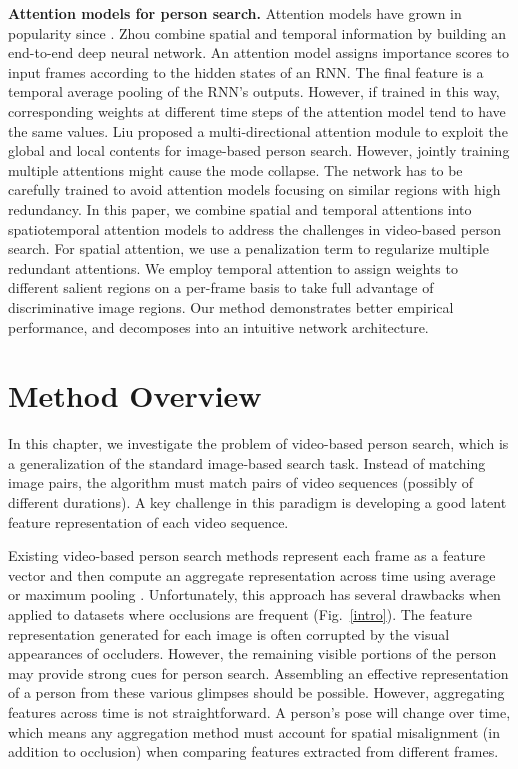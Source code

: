 \textbf{Attention models for person search.} Attention models \cite{xu2015show, Li_2017_CVPR, Li_2017_ICCV} have grown in popularity since \cite{xu2015show}. Zhou \etal \cite{zhousee} combine spatial and temporal information by building an end-to-end deep neural network. An attention model assigns importance scores to input frames according to the hidden states of an RNN. The final feature is a temporal average pooling of the RNN's outputs.
However, if trained in this way, corresponding weights at different time steps of the attention model tend to have the same values. 
Liu \etal \cite{liu2017hydraplus} proposed a multi-directional attention module to exploit the global and local contents for image-based person search. However, jointly training multiple attentions might cause the mode collapse. The network has to be carefully trained to avoid attention models focusing on similar regions with high redundancy. 
In this paper, we combine spatial and temporal attentions into spatiotemporal attention models to address the challenges in video-based person search. 
For spatial attention, we use a penalization term to regularize multiple redundant attentions. 
We employ temporal attention to assign weights to different salient regions on a per-frame basis to take full advantage of discriminative image regions. Our method demonstrates better empirical performance, and decomposes into an intuitive network architecture.


\section{Method Overview} %
In this chapter, we investigate the problem of video-based person search, which is a generalization of the standard image-based search task.  Instead of matching image pairs, the algorithm must match pairs of video sequences (possibly of different durations).  A key challenge in this paradigm is developing a good latent feature representation of each video sequence.

Existing video-based person search methods represent each frame as a feature vector and then compute an aggregate representation across time using average or maximum pooling \cite{zhousee,liu2017video,you2016top}.  Unfortunately, this approach has several drawbacks when applied to datasets where occlusions are frequent (Fig.~\ref{intro}).  The feature representation generated for each image is often corrupted by the visual appearances of occluders.  However, the remaining visible portions of the person may provide strong cues for person search.  Assembling an effective representation of a person from these various glimpses should be possible.  However, aggregating features across time is not straightforward.  A person's pose will change over time, which means any aggregation method must account for spatial misalignment (in addition to occlusion) when comparing features extracted from different frames.

